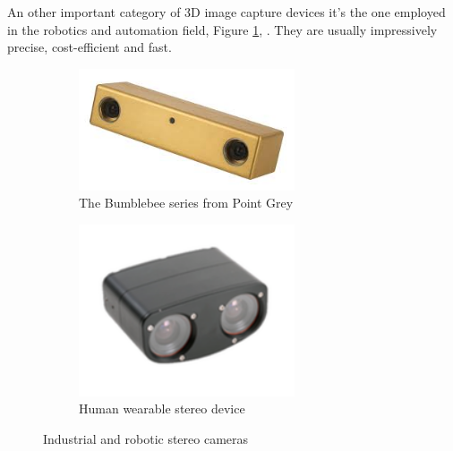 An other important category of 3D image capture devices it's the one employed in the robotics and automation field, Figure \ref{industrial}, \cite{BUMBLE}\cite{AUTO}. They are usually impressively precise, cost-efficient and fast.
\begin{figure}[h!]
\centering
\begin{subfigure}[]{0.4\textwidth}
\centering
\includegraphics[width=0.7\textwidth]{./img/bumble.jpg}
\caption{\scriptsize{The Bumblebee series from Point Grey}}
\end{subfigure}
\begin{subfigure}[]{0.3\textwidth}
\centering
\includegraphics[width=0.7\textwidth]{./img/stereodevices.png}
\caption{\scriptsize{Human wearable stereo device}}
\end{subfigure}
\caption{\small{Industrial and robotic stereo cameras}\label{industrial}}
\end{figure}

